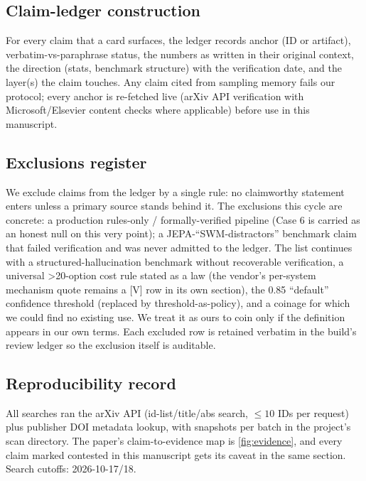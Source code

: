 \subsection{Claim-ledger construction}
For every claim that a card surfaces, the ledger records anchor (ID or artifact), verbatim-vs-paraphrase status, the numbers as written in their original context, the direction
(stats, benchmark structure) with the verification date, and the layer(s) the claim touches.
Any claim cited from sampling memory fails our protocol; every anchor is re-fetched live
(arXiv API verification with Microsoft/Elsevier content checks where applicable) before use in
this manuscript.

\subsection{Exclusions register}
We exclude claims from the ledger by a single rule: no claimworthy statement enters unless a
primary source stands behind it. The exclusions this cycle are concrete: a production rules-only / formally-verified pipeline (Case 6 is carried as an honest null on this very point); a JEPA-``SWM-distractors'' benchmark claim that failed verification and was never admitted to the ledger. The list continues with a structured-hallucination
benchmark without recoverable verification, a universal >20-option cost rule stated as a law (the vendor's per-system mechanism quote remains a [V] row in its own section),
the 0.85 ``default'' confidence threshold (replaced by threshold-as-policy), and a coinage for
which we could find no existing use. We treat it as ours to coin only if the definition appears
in our own terms. Each excluded row is retained verbatim in the build's review ledger so the
exclusion itself is auditable.

\subsection{Reproducibility record}
All searches ran the arXiv API (id-list/title/abs search, \(\le 10\) IDs per request) plus
publisher DOI metadata lookup, with snapshots per batch in the project's scan directory.
The paper's claim-to-evidence map is \cref{fig:evidence}, and every claim marked
contested in this manuscript gets its caveat in the same section.
Search cutoffs: 2026-10-17/18.
